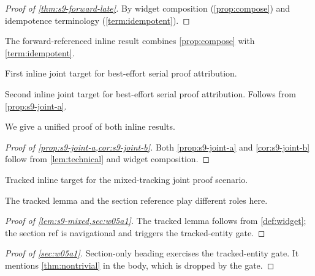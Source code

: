 \documentclass{article}
\begin{document}
\begin{proof}[Proof of \cref{thm:s9-forward-late}]
By widget composition (\cref{prop:compose}) and idempotence terminology
(\cref{term:idempotent}).
\end{proof}

\begin{theorem}\label{thm:s9-forward-late}
The forward-referenced inline result combines \cref{prop:compose}
with \cref{term:idempotent}.
\end{theorem}

\begin{proposition}\label{prop:s9-joint-a}
First inline joint target for best-effort serial proof attribution.
\end{proposition}

\begin{corollary}\label{cor:s9-joint-b}
Second inline joint target for best-effort serial proof attribution.
Follows from \cref{prop:s9-joint-a}.
\end{corollary}

We give a unified proof of both inline results.

\begin{proof}[Proof of \cref{prop:s9-joint-a,cor:s9-joint-b}]
Both \cref{prop:s9-joint-a} and \cref{cor:s9-joint-b} follow from
\cref{lem:technical} and widget composition.
\end{proof}

\begin{lemma}\label{lem:s9-mixed}
Tracked inline target for the mixed-tracking joint proof scenario.
\end{lemma}

The tracked lemma and the section reference play different roles here.

\begin{proof}[Proof of \cref{lem:s9-mixed,sec:w05a1}]
The tracked lemma follows from \cref{def:widget}; the section ref is
navigational and triggers the tracked-entity gate.
\end{proof}

\begin{proof}[Proof of \autoref{sec:w05a1}]
Section-only heading exercises the tracked-entity gate.  It mentions
\cref{thm:nontrivial} in the body, which is dropped by the gate.
\end{proof}
\end{document}
